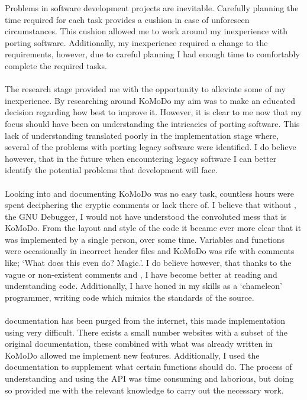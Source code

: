Problems in software development projects are inevitable. Carefully planning the time required for each task provides a cushion in case of unforeseen circumstances. This cushion allowed me to work around my inexperience with porting software. Additionally, my inexperience required a change to the requirements, however, due to careful planning I had enough time to comfortably complete the required tasks.\\\\
%
The research stage provided me with the opportunity to alleviate some of my inexperience. By researching around KoMoDo my aim was to make an educated decision regarding how best to improve it. However, it is clear to me now that my focus should have been on understanding the intricacies of porting software. This lack of understanding translated poorly in the implementation stage where, several of the problems with porting legacy software were identified. I do believe however, that in the future when encountering legacy software I can better identify the potential problems that development will face.\\\\
%
Looking into and documenting KoMoDo was no easy task, countless hours were spent deciphering the cryptic comments or lack there of. I believe that without , the GNU Debugger, I would not have understood the convoluted mess that is KoMoDo. From the layout and style of the code it became ever more clear that it was implemented by a single person, over some time. Variables and functions were occasionally in incorrect header files and KoMoDo was rife with comments like; `What does this even do? Magic.'. I do believe however, that thanks to the vague or non-existent comments and , I have become better at reading and understanding code. Additionally, I have honed in my skills as a `chameleon' programmer, writing code which mimics the standards of the source.\\\\
%
 documentation has been purged from the internet, this made implementation using  very difficult. There exists a small number websites with a subset of the original documentation, these combined with what was already written in KoMoDo allowed me implement new features. Additionally, I used the  documentation to supplement what certain functions should do. The process of understanding and using the  API was time consuming and laborious, but doing so provided me with the relevant knowledge to carry out the necessary work.\\\\
